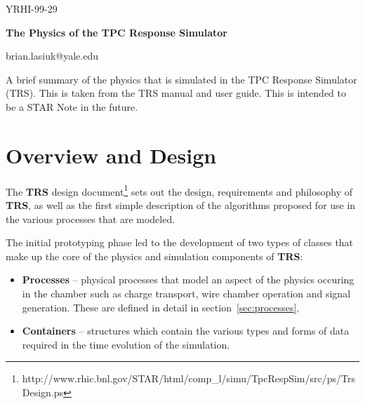 \documentclass{article}
\begin{document}
\begin{center}
\thispagestyle{empty}
\flushbottom
\begin{flushright}  
  {\LARGE YRHI-99-29}
\end{flushright}

\vspace{2cm}

  {\LARGE \bf The Physics of the TPC Response Simulator}

  \vspace{1cm}

  {\large brian.lasiuk@yale.edu}

  \vspace{5cm}

\end{center}
  
  \vspace{1cm}

  \begin{flushleft}
    A brief summary of the physics that is simulated in the TPC
    Response Simulator (TRS).  This is taken from the TRS manual
    and user guide.  This is intended to be a STAR Note in the future.
  \end{flushleft}

  \newpage
{}


\section{Overview and Design}  
\label{sec:design}

The {\bf TRS} design document\footnote{http://www.rhic.bnl.gov/STAR/html/comp\_l/simu/TpcRespSim/src/ps/TrsDesign.ps} 
sets out the design, requirements and philosophy of {\bf TRS}, as well as
the first simple description of the algorithms proposed for use in
the various processes that are modeled.

The initial prototyping
phase led to the development of two types of classes
that make up the core of the physics and simulation components of
{\bf TRS}:
\begin{itemize}
   \item {\bf Processes} -- physical processes that model an aspect of 
     the physics occuring
     in the chamber such as charge transport, wire chamber operation
     and signal generation.  These are defined in detail in 
     section~\ref{sec:processes}.
   \item {\bf Containers} -- structures which contain the various types and
     forms of data required in the time evolution of the simulation.
\end{itemize}
\end{document}
